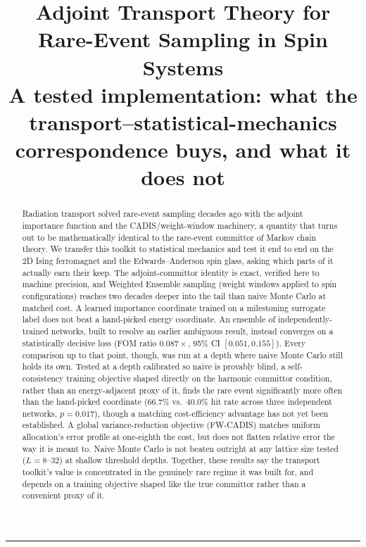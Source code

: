 \documentclass[11pt]{article}
\title{\vspace{-1.2cm}Adjoint Transport Theory for Rare-Event Sampling in Spin
		Systems\\[2pt]
	\large A tested implementation: what the transport--statistical-mechanics
	correspondence buys, and what it does not}
\author{}\date{}
\begin{document}
	\maketitle
	\vspace{-1.3cm}
	\begin{center}\rule{0.62\textwidth}{0.4pt}\end{center}
	
	\begin{abstract}
		\noindent Radiation transport solved rare-event sampling decades ago with the adjoint
		importance function and the CADIS/weight-window machinery, a quantity that turns out to
		be mathematically identical to the rare-event committor of Markov chain theory. We
		transfer this toolkit to statistical mechanics and test it end to end on the 2D Ising
		ferromagnet and the Edwards--Anderson spin glass, asking which parts of it actually earn
		their keep. The adjoint-committor identity is exact, verified here to machine precision,
		and Weighted Ensemble sampling (weight windows applied to spin configurations) reaches
		two decades deeper into the tail than naive Monte Carlo at matched cost. A learned
		importance coordinate trained on a milestoning surrogate label does not beat a
		hand-picked energy coordinate. An ensemble of independently-trained networks, built to
		resolve an earlier ambiguous result, instead converges on a statistically decisive loss
		(FOM ratio $0.087\times$, 95\% CI $[0.051,0.155]$). Every comparison up to that point,
		though, was run at a depth where naive Monte Carlo still holds its own. Tested at a depth
		calibrated so naive is provably blind, a self-consistency training objective shaped
		directly on the harmonic committor condition, rather than an energy-adjacent proxy of it,
		finds the rare event significantly more often than the hand-picked coordinate ($66.7\%$
		vs.\ $40.0\%$ hit rate across three independent networks, $p=0.017$), though a matching
		cost-efficiency advantage has not yet been established. A global variance-reduction
		objective (FW-CADIS) matches uniform allocation's error profile at one-eighth the cost,
		but does not flatten relative error the way it is meant to. Naive Monte Carlo is not
		beaten outright at any lattice size tested ($L=8$--$32$) at shallow threshold depths.
		Together, these results say the transport toolkit's value is concentrated in the
		genuinely rare regime it was built for, and depends on a training objective shaped like
		the true committor rather than a convenient proxy of it.
	\end{abstract}
	
\end{document}
